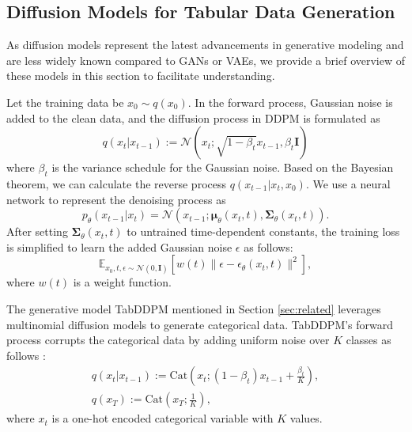 \subsection{Diffusion Models for Tabular Data Generation}
As diffusion models represent the latest advancements in generative modeling and are less widely known compared to GANs or VAEs, we provide a brief overview of these models in this section to facilitate understanding.

Let the training data be $x_0\sim q(x_0)$. In the forward process, Gaussian noise is added to the clean data, and the diffusion process in DDPM \cite{DDPM} is formulated as
\begin{equation}
    q(x_t|x_{t-1}):=\mathcal{N}(x_t;\sqrt{1-\beta_t}x_{t-1},\beta_t\mathbf{I})
\end{equation}
where $\beta_t$ is the variance schedule for the Gaussian noise. Based on the Bayesian theorem, we can calculate the reverse process $q(x_{t-1}|x_t, x_0)$. We use a neural network to represent the denoising process as
\begin{equation}
    p_\theta(x_{t-1}|x_t)=\mathcal{N}(x_{t-1};\boldsymbol{\mu}_\theta(x_t,t),\boldsymbol{\Sigma}_\theta(x_t,t)).
\end{equation}
After setting $\boldsymbol{\Sigma}_\theta(x_t,t)$ to untrained time-dependent constants, the training loss is simplified to learn the added Gaussian noise $\epsilon$ as follows:
\begin{equation}
    \mathbb{E}_{x_0,t,\epsilon\sim\mathcal{N}(0,\boldsymbol{I})}\left[w(t)\|\epsilon-\epsilon_\theta(x_t,t)\|^2\right],
\end{equation}
where $w(t)$ is a weight function.

The generative model TabDDPM \cite{kotelnikov2023tabddpm} mentioned in Section \ref{sec:related} leverages multinomial diffusion models to generate categorical data. TabDDPM's forward process corrupts the categorical data by adding uniform noise over $K$ classes as follows \cite{kotelnikov2023tabddpm}:
\begin{equation}
\begin{aligned}
    q(x_t|x_{t-1}):=\mathrm{Cat}(x_t;(1-\beta_t)x_{t-1}+\frac{\beta_t}{K}),\\
    q(x_T):=\mathrm{Cat}(x_T;\frac{1}{K}),
\end{aligned}
\end{equation}
where $x_t$ is a one-hot encoded categorical variable with $K$ values.

